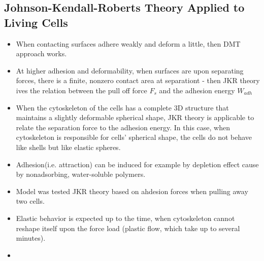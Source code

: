 \documentclass[10pt,a4paper]{article}
\begin{document}
\subsection{Johnson-Kendall-Roberts Theory Applied to Living Cells \cite{pin:05}}
\begin{itemize}
 \item When contacting surfaces adhere weakly and deform a little, then DMT approach works.
 \item At higher adhesion and deformability, when surfaces are upon separating forces, 
 there is a finite, nonzero contact area at separationt - then JKR theory ives the relation between the pull off force $F_s$ and the adhesion energy $W_{adh}$
 \item When the cytoskeleton of the cells has a complete 3D structure that maintains a slightly deformable spherical shape, 
 JKR theory is applicable to relate the separation force to the adhesion energy. In this case, when cytoskeleton is responsible for
 cells' spherical shape, the cells do not behave like shells but like elastic spheres.
 \item Adhesion(i.e. attraction) can be induced for example by depletion effect cause by nonadsorbing, water-soluble polymers.
 \item Model was tested JKR theory based on ahdesion forces when pulling away two cells. 
 \item Elastic behavior is expected up to the time, when cytoskeleton cannot reshape itself upon the force load (plastic flow, which take up to several minutes).
 \item 
\end{itemize}
\end{document}
